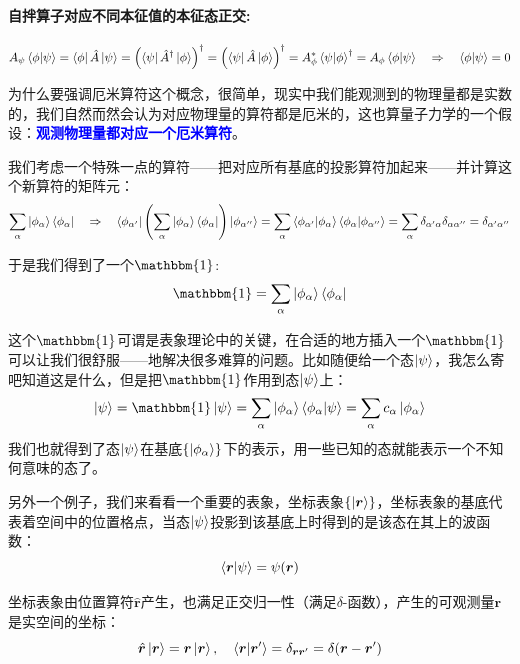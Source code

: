 \paragraph*{自拌算子对应不同本征值的本征态正交:}
\[A_{\psi}\bra{\phi}\ket{\psi}=\bra{\phi}\hat{A}\ket{\psi}=\left(\bra{\psi}\hat{A}^{\dagger}\ket{\phi}\right)^{\dagger}=\left(\bra{\psi}\hat{A}\ket{\phi}\right)^{\dagger}=A_{\phi}^*\bra{\psi}\ket{\phi}^{\dagger}=A_{\phi}\bra{\phi}\ket{\psi} \quad \Rightarrow \quad \bra{\phi}\ket{\psi}=0\]

为什么要强调厄米算符这个概念，很简单，现实中我们能观测到的物理量都是实数的，我们自然而然会认为对应物理量的算符都是厄米的，这也算量子力学的一个假设：\textcolor{blue}{\textbf{观测物理量都对应一个厄米算符}}。

我们考虑一个特殊一点的算符——把对应所有基底的投影算符加起来——并计算这个新算符的矩阵元：
\[\sum_{\alpha}\ket{\phi_{\alpha}}\bra{\phi_{\alpha}} \quad \Rightarrow \quad \bra{\phi_{\alpha'}}\left(\sum_{\alpha}\ket{\phi_{\alpha}}\bra{\phi_{\alpha}}\right)\ket{\phi_{\alpha''}}=\sum_{\alpha}\bra{\phi_{\alpha'}}\ket{\phi_{\alpha}}\bra{\phi_{\alpha}}\ket{\phi_{\alpha''}}=\sum_{\alpha}\delta_{\alpha'\alpha}\delta_{\alpha\alpha''}=\delta_{\alpha'\alpha''}\]

于是我们得到了一个$\mathbbm{1}$:
\[\mathbbm{1}=\sum_{\alpha}\ket{\phi_{\alpha}}\bra{\phi_{\alpha}}\]

这个$\mathbbm{1}$可谓是表象理论中的关键，在合适的地方插入一个$\mathbbm{1}$可以让我们很舒服——地解决很多难算的问题。比如随便给一个态$\ket{\psi}$，我怎么寄吧知道这是什么，但是把$\mathbbm{1}$作用到态$\ket{\psi}$上：
\[\ket{\psi}=\mathbbm{1}\ket{\psi}=\sum_{\alpha}\ket{\phi_{\alpha}}\bra{\phi_{\alpha}}\ket{\psi}=\sum_{\alpha}c_{\alpha}\ket{\phi_{\alpha}}\]
我们也就得到了态$\ket{\psi}$在基底$\{\ket{\phi_{\alpha}}\}$下的表示，用一些已知的态就能表示一个不知何意味的态了。

另外一个例子，我们来看看一个重要的表象，坐标表象$\{\ket{\bm{r}}\}$，坐标表象的基底代表着空间中的位置格点，当态$\ket{\psi}$投影到该基底上时得到的是该态在其上的波函数：
\[\bra{\bm{r}}\ket{\psi}=\psi(\bm{r})\]

坐标表象由位置算符$\hat{\bm{r}}$产生，也满足正交归一性（满足$\delta$-函数），产生的可观测量$\bm{r}$是实空间的坐标：
\[\hat{\bm{r}}\ket{\bm{r}}=\bm{r}\ket{\bm{r}}, \quad \bra{\bm{r}}\ket{\bm{r}'}=\delta_{\bm{r}\bm{r}'}=\delta(\bm{r}-\bm{r}')\]

